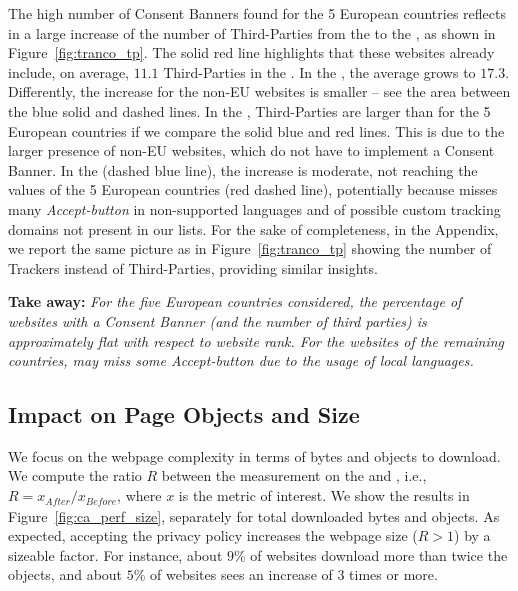 The high number of Consent Banners found for the 5 European countries reflects in a large increase of the number of Third-Parties from the \BEFORE to the \AFTER, as shown in Figure~\ref{fig:tranco_tp}. The solid red line highlights that these websites already include, on average, $11.1$ Third-Parties in the \BEFORE. In the \AFTER, the average grows to $17.3$. Differently, the increase for the non-EU websites is smaller -- see the area between the blue solid and dashed lines. In the \BEFORE, Third-Parties are larger than for the 5 European countries if we compare the solid blue and red lines. This is due to the larger presence of non-EU websites, which do not have to implement a Consent Banner. In the \AFTER (dashed blue line), the increase is moderate, not reaching the values of the 5 European countries (red dashed line), potentially because \TOOL misses many \emph{Accept-button} in non-supported languages and of possible custom tracking domains not present in our lists. For the sake of completeness, in the Appendix, we report the same picture as in Figure~\ref{fig:tranco_tp} showing the number of Trackers instead of Third-Parties, providing similar insights.

\textbf{Take away:} 
\textit{For the five European countries considered, the percentage of websites with a Consent Banner (and the number of third parties) is approximately flat with respect to website rank. For the websites of the remaining countries, \TOOL may miss some \emph{Accept-button} due to the usage of local languages.}

\subsection{Impact on Page Objects and Size}

We focus on the webpage complexity in terms of  bytes and objects to download. We compute the ratio $R$ between the measurement on the \BEFORE and \AFTER, i.e., $R = x_{\textit{After}}/x_{\textit{Before}}$, where $x$ is the metric of interest. We show the results in Figure~\ref{fig:ca_perf_size}, separately for total downloaded bytes and objects. As expected, accepting the privacy policy increases the webpage size ($R>1$) by a sizeable factor. For instance, about $9$\% of websites download more than twice the objects, and about $5$\% of websites sees an increase of 3 times or more.

